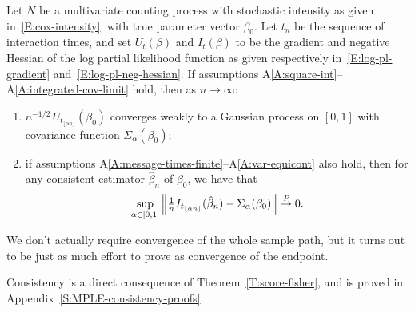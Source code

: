 \documentclass[final]{statsoc}
\begin{document}
\begin{theorem}\label{T:score-fisher}
    Let $N$ be a multivariate counting process with stochastic
    intensity as given in~\eqref{E:cox-intensity}, with true parameter
    vector $\beta_0$.  Let $t_n$ be the sequence of interaction times,
    and set $U_t(\beta)$ and $I_t(\beta)$ to
    be the gradient and negative Hessian of the log partial likelihood
    function
    as given respectively in~\eqref{E:log-pl-gradient} and~\eqref{E:log-pl-neg-hessian}.  If
    assumptions A\ref{A:square-int}--A\ref{A:integrated-cov-limit} hold, then
    as $n \to \infty$:
    \begin{enumerate}
        \item \label{I:score-part}
        $n^{-1/2} \, U_{t_{\lfloor \alpha n \rfloor}}(\beta_0)$
        converges weakly to a Gaussian process on $[0,1]$ with
        covariance function $\Sigma_\alpha(\beta_0)$;

        \item \label{I:fisher-part}
        if assumptions
        A\ref{A:message-times-finite}--A\ref{A:var-equicont} also hold, then for any consistent
        estimator $\hat \beta_n$ of $\beta_0$,
        we have that
        \[
            \sup_{\alpha \in [0,1]}
            \left\|
                \tfrac{1}{n}
                I_{t_{\lfloor \alpha n \rfloor}}(\hat \beta_{n})
                -
                \Sigma_\alpha(\beta_0)
            \right\|
            \overset{\mathit{P}}{\to}
            0.
        \]
    \end{enumerate}
\end{theorem}

\noindent
We don't actually require convergence of the whole sample path, but
it turns out to be just as much effort to prove as convergence of the
endpoint.

Consistency is a direct consequence of Theorem~\ref{T:score-fisher},
and is proved in Appendix~\ref{S:MPLE-consistency-proofs}.
\end{document}
